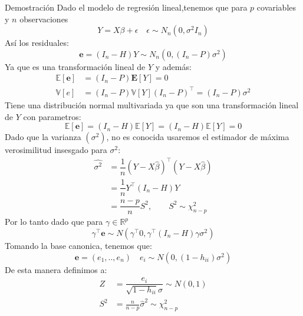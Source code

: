 \documentclass[a4paper,11pt]{article}
\begin{document}
\begin{demostracion}{Demostración}
    Dado el modelo de regresión lineal,tenemos que para $p$ covariables y $n$ observaciones
    \[
        Y=X\beta+\epsilon\quad \epsilon\sim N_n(0, \sigma^2I_n)
    \]
    Así los residuales:
    \[
        \mathbf{e}=(I_n-H)Y\sim N_n(0, (I_n-P)\sigma^2)
    \]
    Ya que es una transformación lineal de $Y$ y además:
    \begin{align*}
        \mathbb{E}[\mathbf{e}] & =(I_n-P)\mathbf{E}[Y]=0                           \\
        \mathbb{V}[e]          & =(I_n-P)\mathbb{V}[Y](I_n-P)^\top=(I_n-P)\sigma^2
    \end{align*}
    Tiene una distribución normal multivariada ya que son una transformación lineal de $Y$ con parametros:
    \[
        \mathbb{E}[\mathbf{e}]=
        (I_n-H)\mathbb{E}[Y]=(I_n-H)
        \mathbb{E}[Y]=0
    \]
    Dado que la varianza $(\sigma^2)$, no es conocida usaremos el estimador de máxima verosimilitud insesgado para $\sigma^2$:
    \begin{align*}
        \hat{\sigma^2} & =\dfrac{1}{n}(Y-X\hat{\beta})^\top(Y-X\hat{\beta})  \\
                       & =\dfrac{1}{n}Y^\top(I_n-H)Y                         \\
                       & =\dfrac{n-p}{n}S^2, \quad\quad S^2\sim \chi^2_{n-p}
    \end{align*}
    Por lo tanto dado que para $\gamma\in \mathbb{R}^p$
    \[
        \gamma^\top \mathbf{e}\sim N(\gamma^\top 0, \gamma^\top (I_n-H)\gamma\sigma^2)
    \]
    Tomando la base canonica, tenemos que:
    \[
        \mathbf{e}=(e_1,..,e_n)\quad e_i\sim N(0, (1-h_{ii} )\sigma^2)
    \]
    De esta manera definimos a:
    \begin{align*}
        Z   & =\dfrac{e_i}{\sqrt{1-h_{ii} }\sigma}\sim N(0,1) \\
        S^2 & =\frac{n}{n-p}\hat{\sigma}^2\sim \chi^2_{n-p}
    \end{align*}
\end{demostracion}
\end{document}
